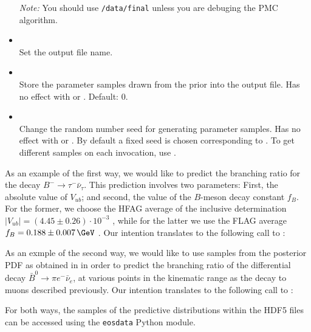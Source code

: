 \begin{itemize}
        \emph{Note:} You should use \texttt{/data/final} unless you are
        debuging the PMC algorithm.

    \item[] \\[\medskipamount]
      Set the output file name.

    \item[] \\[\medskipamount]
      Store the parameter samples drawn from the prior into the output file. Has
      no effect with  or . Default: 0.

    \item[] \\[\medskipamount]
      Change the random number seed for generating parameter samples. Has no
      effect with  or . By default a fixed
      seed is chosen corresponding to . To get different samples on
      each invocation, use .

\end{itemize}

As an example of the first way, we would like to predict the branching
ratio for the decay $B^- \to \tau^- \bar{\nu}_\tau$. This prediction involves
two parameters: First, the absolute value of $V_{ub}$; and second, the value
of the $B$-meson decay constant $f_{B}$. For the former, we choose the
HFAG average of the inclusive determination $|V_{ub}| = (4.45 \pm 0.26) \cdot 10^{-3}$
\cite{Amhis:2014hma}, while for the latter we use the FLAG average
$f_{B} = 0.188 \pm 0.007\,\GeV$ \cite{Aoki:2013ldr}.
Our intention translates to the following call to :

As an exmple of the second way, we would like to use samples from the posterior
PDF as obtained in  in order to predict the
branching ratio of the differential decay $\bar{B}^0\to \pi e^- \bar{\nu}_e$, at various
points in the kinematic range as the decay to muons described previously.
Our intention translates to the following call to :

For both ways, the samples of the predictive distributions within the HDF5 files
can be accessed using the \texttt{eosdata} Python module.

